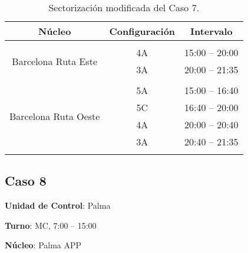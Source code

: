 \begin{table}[h]
	\centering
	\caption{Sectorización modificada del Caso 7.}
	\label{table:D:caso7-modif}
	\begin{tabular}{ccc}
		\hline
		\textbf{Núcleo}                                              & \textbf{Configuración} & \textbf{Intervalo} \\ \hline
		&                        &                    \\
		\multicolumn{1}{c|}{\multirow{2}{*}{Barcelona Ruta Este}}    & 4A                     & 15:00 -- 20:00     \\
		\multicolumn{1}{c|}{}                                        & 3A                     & 20:00 -- 21:35     \\
		&                        &                    \\
		\multicolumn{1}{c|}{\multirow{4}{*}{Barcelona Ruta   Oeste}} & 5A                     & 15:00 -- 16:40     \\
		\multicolumn{1}{c|}{}                                        & 5C                     & 16:40 -- 20:00     \\
		\multicolumn{1}{c|}{}                                        & 4A                     & 20:00 -- 20:40     \\
		\multicolumn{1}{c|}{}                                        & 3A                     & 20:40 -- 21:35     \\
		&                        &                    \\ \hline
	\end{tabular}
\end{table}


\subsection{Caso 8}

\textbf{Unidad de Control}: Palma

\textbf{Turno}: MC, 7:00 -- 15:00

\textbf{Núcleo}: Palma APP

